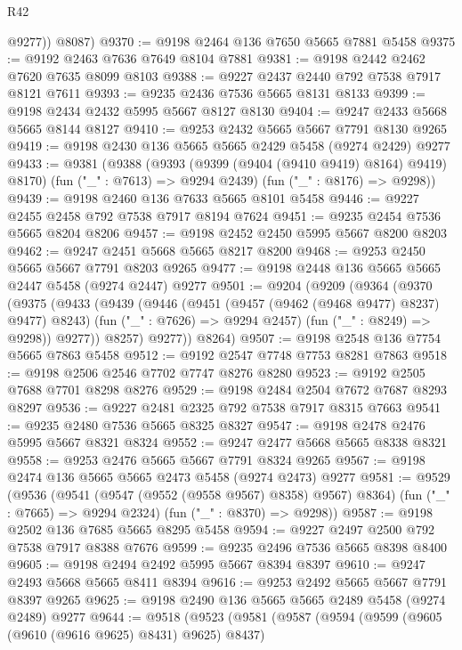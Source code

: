 \begin{lexlean}{R42}
\begin{coremodule}
          @9277))
      @8087)
@9370 := @9198 @2464 @136 @7650 @5665 @7881 @5458
@9375 := @9192 @2463 @7636 @7649 @8104 @7881
@9381 := @9198 @2442 @2462 @7620 @7635 @8099 @8103
@9388 := @9227 @2437 @2440 @792 @7538 @7917 @8121 @7611
@9393 := @9235 @2436 @7536 @5665 @8131 @8133
@9399 := @9198 @2434 @2432 @5995 @5667 @8127 @8130
@9404 := @9247 @2433 @5668 @5665 @8144 @8127
@9410 := @9253 @2432 @5665 @5667 @7791 @8130 @9265
@9419 := @9198 @2430 @136 @5665 @5665 @2429 @5458 (@9274 @2429) @9277
@9433 := @9381
    (@9388
      (@9393 (@9399 (@9404 (@9410 @9419) @8164) @9419) @8170)
      (fun ("_" : @7613) => @9294 @2439)
      (fun ("_" : @8176) => @9298))
@9439 := @9198 @2460 @136 @7633 @5665 @8101 @5458
@9446 := @9227 @2455 @2458 @792 @7538 @7917 @8194 @7624
@9451 := @9235 @2454 @7536 @5665 @8204 @8206
@9457 := @9198 @2452 @2450 @5995 @5667 @8200 @8203
@9462 := @9247 @2451 @5668 @5665 @8217 @8200
@9468 := @9253 @2450 @5665 @5667 @7791 @8203 @9265
@9477 := @9198 @2448 @136 @5665 @5665 @2447 @5458 (@9274 @2447) @9277
@9501 := @9204
    (@9209
      (@9364
        (@9370
          (@9375
            (@9433
              (@9439
                (@9446
                  (@9451 (@9457 (@9462 (@9468 @9477) @8237) @9477) @8243)
                  (fun ("_" : @7626) => @9294 @2457)
                  (fun ("_" : @8249) => @9298))
                @9277))
            @8257)
          @9277))
      @8264)
@9507 := @9198 @2548 @136 @7754 @5665 @7863 @5458
@9512 := @9192 @2547 @7748 @7753 @8281 @7863
@9518 := @9198 @2506 @2546 @7702 @7747 @8276 @8280
@9523 := @9192 @2505 @7688 @7701 @8298 @8276
@9529 := @9198 @2484 @2504 @7672 @7687 @8293 @8297
@9536 := @9227 @2481 @2325 @792 @7538 @7917 @8315 @7663
@9541 := @9235 @2480 @7536 @5665 @8325 @8327
@9547 := @9198 @2478 @2476 @5995 @5667 @8321 @8324
@9552 := @9247 @2477 @5668 @5665 @8338 @8321
@9558 := @9253 @2476 @5665 @5667 @7791 @8324 @9265
@9567 := @9198 @2474 @136 @5665 @5665 @2473 @5458 (@9274 @2473) @9277
@9581 := @9529
    (@9536
      (@9541 (@9547 (@9552 (@9558 @9567) @8358) @9567) @8364)
      (fun ("_" : @7665) => @9294 @2324)
      (fun ("_" : @8370) => @9298))
@9587 := @9198 @2502 @136 @7685 @5665 @8295 @5458
@9594 := @9227 @2497 @2500 @792 @7538 @7917 @8388 @7676
@9599 := @9235 @2496 @7536 @5665 @8398 @8400
@9605 := @9198 @2494 @2492 @5995 @5667 @8394 @8397
@9610 := @9247 @2493 @5668 @5665 @8411 @8394
@9616 := @9253 @2492 @5665 @5667 @7791 @8397 @9265
@9625 := @9198 @2490 @136 @5665 @5665 @2489 @5458 (@9274 @2489) @9277
@9644 := @9518
    (@9523
      (@9581
        (@9587
          (@9594
            (@9599 (@9605 (@9610 (@9616 @9625) @8431) @9625) @8437)

\end{coremodule}
\end{lexlean}
